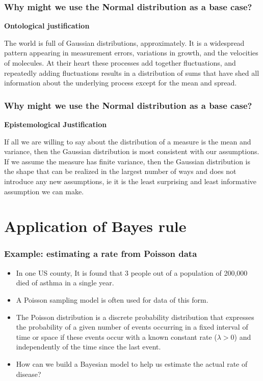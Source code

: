 \documentclass{beamer}
\begin{document}
\begin{frame}
\frametitle{Why might we use the Normal distribution as a base case?}

\textbf{Ontological justification}

\bigskip

The world is full of Gaussian distributions, approximately. It is a widespread pattern appearing in measurement errors, variations in growth, and the velocities of molecules. At their heart these processes add together fluctuations, and repeatedly adding fluctuations results in a distribution of sums that have shed all information about the underlying process except for the mean and spread.

\end{frame}



\begin{frame}
\frametitle{Why might we use the Normal distribution as a base case?}

\textbf{Epistemological Justification}

\bigskip

If all we are willing to say about the distribution of a measure is the mean and variance, then the Gaussian distribution is most consistent with our assumptions. If we assume the measure has finite variance, then the Gaussian distribution is the shape that can be realized in the largest number of ways and does not introduce any new assumptions, ie it is the least surprising and least informative assumption we can make.

\end{frame}

\section{Application of Bayes rule}

\begin{frame}
\frametitle{Example: estimating a rate from Poisson data}

\begin{itemize}
	\item In one US county, It is found that 3 people out of a population of 200,000 died of asthma in a single year.
	
	\item A Poisson sampling model is often used for data of this form.
	
	\item The Poisson distribution is a discrete probability distribution that expresses the probability of a given number of events occurring in a fixed interval of time or space if these events occur with a known constant rate ($\lambda > 0$) and independently of the time since the last event.

	\item How can we build a Bayesian model to help us estimate the actual rate of disease?
\end{itemize}


\end{frame}
\end{document}
